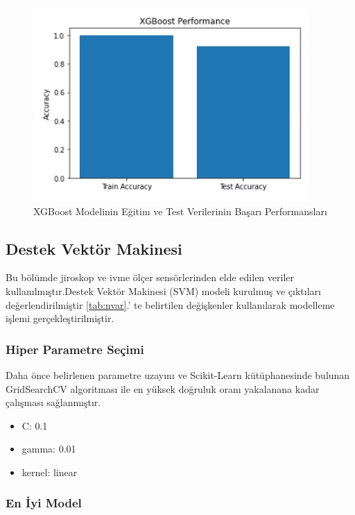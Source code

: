 \documentclass[12pt,twoside]{deuthesis}
\providecommand{\tightlist}{%
  \setlength{\itemsep}{0pt}\setlength{\parskip}{0pt}}
\begin{document}
\begin{figure}

{\centering \includegraphics[width=0.6\linewidth,height=0.25\textheight]{figure/jixgboost_testtrain} 

}

\caption{XGBoost Modelinin Eğitim ve Test Verilerinin Başarı Performansları}\label{fig:jixgboosttesttrain}
\end{figure}
\hypertarget{destek-vektuxf6r-makinesi-3}{%
\subsection{Destek Vektör Makinesi}\label{destek-vektuxf6r-makinesi-3}}

Bu bölümde jiroskop ve ivme ölçer sensörlerinden elde edilen veriler kullanılmıştır.Destek Vektör Makinesi (SVM) modeli kurulmuş ve çıktıları değerlendirilmiştir
\ref{tab:nvar}.' te belirtilen değişkenler kullanılarak modelleme işlemi gerçekleştirilmiştir.

\hypertarget{hiper-parametre-seuxe7imi-11}{%
\subsubsection{Hiper Parametre Seçimi}\label{hiper-parametre-seuxe7imi-11}}

Daha önce belirlenen parametre uzayını ve Scikit-Learn kütüphanesinde bulunan GridSearchCV algoritması ile en yüksek doğruluk oranı yakalanana kadar çalışması sağlanmıştır.
\begin{itemize}
\tightlist
\item
  C: 0.1
\item
  gamma: 0.01
\item
  kernel: linear
\end{itemize}
\hypertarget{en-iyi-model-13}{%
\subsubsection{En İyi Model}\label{en-iyi-model-13}}
\end{document}
